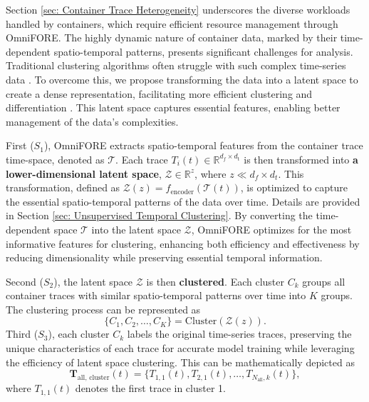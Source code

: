 \documentclass{ieeetmlcn}
\begin{document}
Section \ref{sec: Container Trace Heterogeneity} underscores the diverse workloads handled by containers, which require efficient resource management through OmniFORE. The highly dynamic nature of container data, marked by their time-dependent spatio-temporal patterns, presents significant challenges for analysis. Traditional clustering algorithms often struggle with such complex time-series data \cite{gupta2020approaches}. To overcome this, we propose transforming the data into a latent space to create a dense representation, facilitating more efficient clustering and differentiation \cite{frazier2018tutorial}. This latent space captures essential features, enabling better management of the data's complexities.

First ($S_1$), OmniFORE extracts spatio-temporal features from the container trace time-space, denoted as $\mathcal{T}$. Each trace $T_i(t) \in \mathbb{R}^{d_f \times d_{\text{t}}}$ is then transformed into \textbf{a lower-dimensional latent space}, $\mathcal{Z} \in \mathbb{R}^{z}$, where $z \ll d_f \times d_t$. This transformation, defined as $\mathcal{Z}(z) = f_{\text{encoder}}(\mathcal{T}(t))$, is optimized to capture the essential spatio-temporal patterns of the data over time. Details are provided in Section \ref{sec: Unsupervised Temporal Clustering}. By converting the time-dependent space $\mathcal{T}$ into the latent space $\mathcal{Z}$, OmniFORE optimizes for the most informative features for clustering, enhancing both efficiency and effectiveness by reducing dimensionality while preserving essential temporal information.

Second ($S_2$), the latent space $\mathcal{Z}$ is then \textbf{clustered}. Each cluster $C_k$ groups all container traces with similar spatio-temporal patterns over time into $K$ groups. The clustering process can be represented as
\begin{equation}   
\{C_1, C_2, \ldots, C_K\} = \text{Cluster}(\mathcal{Z}(z)).
\end{equation}
Third ($S_3$), each cluster \(C_k\) labels the original time-series traces, preserving the unique characteristics of each trace for accurate model training while leveraging the efficiency of latent space clustering. This can be mathematically depicted as
\begin{equation}
\mathbf{T}_{\text{all, cluster}}(t) = \{T_{1,1}(t), T_{2,1}(t), \ldots, T_{N_\text{all},k}(t)\},
\end{equation}
where $T_{1,1}(t)$ denotes the first trace in cluster 1.
\end{document}
